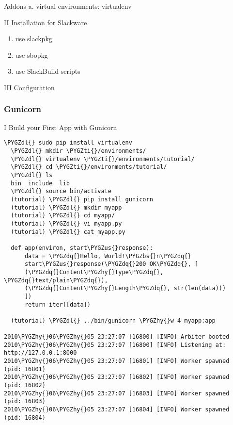 \documentclass[letterpaper,10pt,english]{sphinxmanual}
\def\PYGZbs{\char`\\}
\def\PYGZus{\char`\_}
\def\PYGZdl{\char`\$}
\def\PYGZhy{\char`\-}
\def\PYGZdq{\char`\"}
\def\PYGZti{\char`\~}
\begin{document}
Addons
a. virtual environments: virtualenv

II Installation for Slackware
\begin{enumerate}
\item {} 
use slackpkg

\item {} 
use sbopkg

\item {} 
use SlackBuild scripts

\end{enumerate}

III Configuration


\subsubsection{Gunicorn}
\label{sdocs/django/gunicorn/gunicorn::doc}\label{sdocs/django/gunicorn/gunicorn:gunicorn}
I Build your First App with Gunicorn

\begin{Verbatim}[commandchars=\\\{\}]
  \PYGZdl{} sudo pip install virtualenv
  \PYGZdl{} mkdir \PYGZti{}/environments/
  \PYGZdl{} virtualenv \PYGZti{}/environments/tutorial/
  \PYGZdl{} cd \PYGZti{}/environments/tutorial/
  \PYGZdl{} ls
  bin  include  lib
  \PYGZdl{} source bin/activate
  (tutorial) \PYGZdl{} pip install gunicorn
  (tutorial) \PYGZdl{} mkdir myapp
  (tutorial) \PYGZdl{} cd myapp/
  (tutorial) \PYGZdl{} vi myapp.py
  (tutorial) \PYGZdl{} cat myapp.py

  def app(environ, start\PYGZus{}response):
      data = \PYGZdq{}Hello, World!\PYGZbs{}n\PYGZdq{}
      start\PYGZus{}response(\PYGZdq{}200 OK\PYGZdq{}, [
      (\PYGZdq{}Content\PYGZhy{}Type\PYGZdq{}, \PYGZdq{}text/plain\PYGZdq{}),
      (\PYGZdq{}Content\PYGZhy{}Length\PYGZdq{}, str(len(data)))
      ])
      return iter([data])

  (tutorial) \PYGZdl{} ../bin/gunicorn \PYGZhy{}w 4 myapp:app

2010\PYGZhy{}06\PYGZhy{}05 23:27:07 [16800] [INFO] Arbiter booted 
2010\PYGZhy{}06\PYGZhy{}05 23:27:07 [16800] [INFO] Listening at: http://127.0.0.1:8000 
2010\PYGZhy{}06\PYGZhy{}05 23:27:07 [16801] [INFO] Worker spawned (pid: 16801) 
2010\PYGZhy{}06\PYGZhy{}05 23:27:07 [16802] [INFO] Worker spawned (pid: 16802) 
2010\PYGZhy{}06\PYGZhy{}05 23:27:07 [16803] [INFO] Worker spawned (pid: 16803) 
2010\PYGZhy{}06\PYGZhy{}05 23:27:07 [16804] [INFO] Worker spawned (pid: 16804)
\end{Verbatim}
\end{document}
